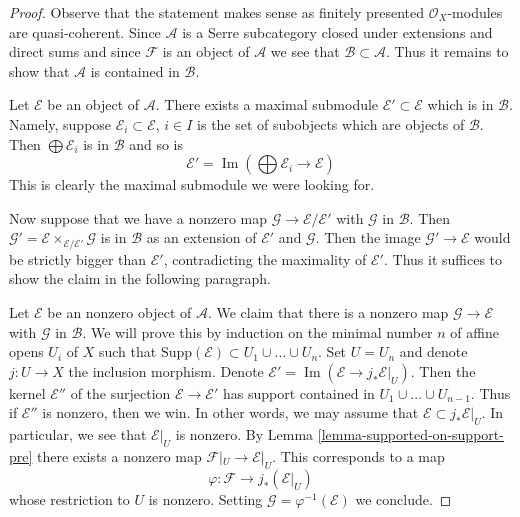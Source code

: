 \documentclass[10pt,a4paper]{amsart}
\theoremstyle{plain}
\theoremstyle{definition}
\theoremstyle{remark}
\numberwithin{equation}{subsection}
\def\Im{\mathop{\mathrm{Im}}}
\begin{document}
\begin{proof}
Observe that the statement makes sense as finitely presented
$\mathcal{O}_X$-modules are quasi-coherent.
Since $\mathcal{A}$ is a Serre subcategory closed under extensions and
direct sums and since $\mathcal{F}$ is an object of $\mathcal{A}$
we see that $\mathcal{B} \subset \mathcal{A}$. Thus it remains to
show that $\mathcal{A}$ is contained in $\mathcal{B}$.

\medskip\noindent
Let $\mathcal{E}$ be an object of $\mathcal{A}$. There exists
a maximal submodule $\mathcal{E}' \subset \mathcal{E}$
which is in $\mathcal{B}$. Namely, suppose
$\mathcal{E}_i \subset \mathcal{E}$, $i \in I$ is the set of
subobjects which are objects of $\mathcal{B}$. Then
$\bigoplus \mathcal{E}_i$ is in $\mathcal{B}$ and so is
$$
\mathcal{E}' = \Im(\bigoplus \mathcal{E}_i \longrightarrow \mathcal{E})
$$
This is clearly the maximal submodule we were looking for.

\medskip\noindent
Now suppose that we have a nonzero map
$\mathcal{G} \to \mathcal{E}/\mathcal{E}'$
with $\mathcal{G}$ in $\mathcal{B}$. Then
$\mathcal{G}' = \mathcal{E} \times_{\mathcal{E}/\mathcal{E}'} \mathcal{G}$
is in $\mathcal{B}$ as an extension of $\mathcal{E}'$ and $\mathcal{G}$.
Then the image $\mathcal{G}' \to \mathcal{E}$ would be strictly
bigger than $\mathcal{E}'$, contradicting the maximality of $\mathcal{E}'$.
Thus it suffices to show the claim in the following paragraph.

\medskip\noindent
Let $\mathcal{E}$ be an nonzero object of $\mathcal{A}$. We claim that there
is a nonzero map $\mathcal{G} \to \mathcal{E}$ with $\mathcal{G}$ in
$\mathcal{B}$. We will prove this by induction on the minimal
number $n$ of affine opens $U_i$ of $X$ such that
$\text{Supp}(\mathcal{E}) \subset U_1 \cup \ldots \cup U_n$.
Set $U = U_n$ and denote $j : U \to X$ the inclusion morphism.
Denote $\mathcal{E}' = \Im(\mathcal{E} \to j_*\mathcal{E}|_U)$.
Then the kernel $\mathcal{E}''$ of the surjection
$\mathcal{E} \to \mathcal{E}'$ has support contained in
$U_1 \cup \ldots \cup U_{n - 1}$. Thus if $\mathcal{E}''$ is nonzero,
then we win. In other words, we may assume that
$\mathcal{E} \subset j_*\mathcal{E}|_U$.
In particular, we see that $\mathcal{E}|_U$ is nonzero.
By Lemma \ref{lemma-supported-on-support-pre}
there exists a nonzero map $\mathcal{F}|_U \to \mathcal{E}|_U$.
This corresponds to a map
$$
\varphi : \mathcal{F} \longrightarrow j_*(\mathcal{E}|_U)
$$
whose restriction to $U$ is nonzero.
Setting $\mathcal{G} = \varphi^{-1}(\mathcal{E})$ we conclude.
\end{proof}
\end{document}
